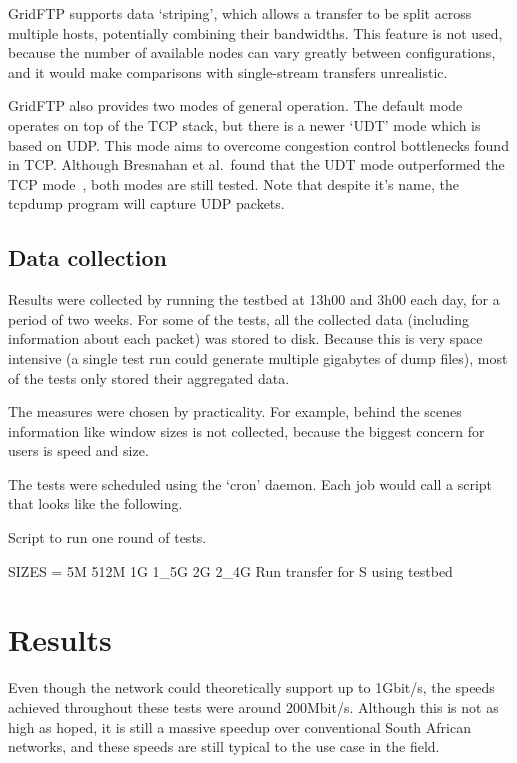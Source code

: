 \documentclass{sig-alternate-05-2015}
\begin{document}
GridFTP supports data `striping', which allows a transfer to be split across multiple hosts, potentially combining their bandwidths. This feature is not used, because the number of available nodes can vary greatly between configurations, and it would make comparisons with single-stream transfers unrealistic.

GridFTP also provides two modes of general operation. The default mode operates on top of the TCP stack, but there is a newer `UDT' mode which is based on UDP\@. This mode aims to overcome congestion control bottlenecks found in TCP\@. Although Bresnahan et al.\ found that the UDT mode outperformed the TCP mode~\cite{bresnahan2009udt}, both modes are still tested. Note that despite it's name, the tcpdump program will capture UDP packets.

\subsection{Data collection}
Results were collected by running the testbed at 13h00 and 3h00 each day, for a period of two weeks. For some of the tests, all the collected data (including information about each packet) was stored to disk. Because this is very space intensive (a single test run could generate multiple gigabytes of dump files), most of the tests only stored their aggregated data. 

The measures were chosen by practicality. For example, behind the scenes information like window sizes is not collected, because the biggest concern for users is speed and size.

The tests were scheduled using the `cron' daemon. Each job would call a script that looks like the following.

\begin{algorithm}
\caption{Script to run one round of tests.}
	\begin{algorithmic}
		\STATE SIZES = 5M 512M 1G 1\_5G 2G 2\_4G
		\STATE Run transfer for S using testbed
		\ENDFOR
		\ENDFOR
	\end{algorithmic}
\label{alg:script}
\end{algorithm}

\section{Results}

Even though the network could theoretically support up to 1Gbit/s, the speeds achieved throughout these tests were around 200Mbit/s. Although this is not as high as hoped, it is still a massive speedup over conventional South African networks, and these speeds are still typical to the use case in the field.
\end{document}
